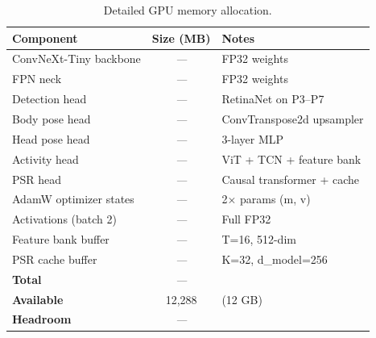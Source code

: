 \documentclass[10pt,twocolumn]{article}
\newcommand{\todo}{\textit{---}}
\newcommand{\popwres}{\todo}
\begin{document}
\begin{table}[htbp]
\centering
\small
\caption{Detailed GPU memory allocation.}
\label{tab:memory-detailed}
\begin{tabular}{l c l}
\toprule
\textbf{Component} & \textbf{Size (MB)} & \textbf{Notes} \\
\midrule
ConvNeXt-Tiny backbone & \popwres & FP32 weights \\
FPN neck & \popwres & FP32 weights \\
Detection head & \popwres & RetinaNet on P3--P7 \\
Body pose head & \popwres & ConvTranspose2d upsampler \\
Head pose head & \popwres & 3-layer MLP \\
Activity head & \popwres & ViT + TCN + feature bank \\
PSR head & \popwres & Causal transformer + cache \\
AdamW optimizer states & \popwres & 2$\times$ params (m, v) \\
Activations (batch 2) & \popwres & Full FP32 \\
Feature bank buffer & \popwres & T=16, 512-dim \\
PSR cache buffer & \popwres & K=32, d\_model=256 \\
\midrule
\textbf{Total} & \popwres & \\
\hline
\textbf{Available} & 12,288 & (12 GB) \\
\hline
\textbf{Headroom} & \popwres & \\
\bottomrule
\end{tabular}
\end{table}
\end{document}

